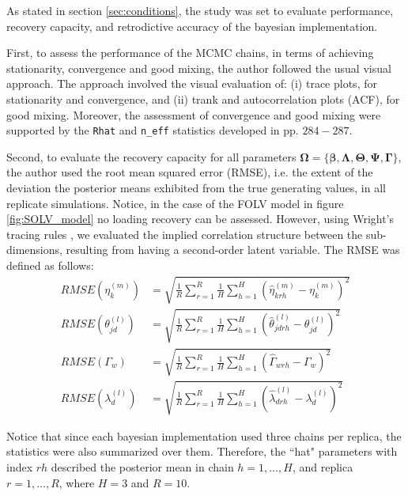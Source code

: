 As stated in section \ref{sec:conditions}, the study was set to evaluate performance, recovery capacity, and retrodictive accuracy of the bayesian implementation.

First, to assess the performance of the MCMC chains, in terms of achieving stationarity, convergence and good mixing, the author followed the usual visual approach. The approach involved the visual evaluation of: (i) trace plots, for stationarity and convergence, and (ii) trank and autocorrelation plots (ACF), for good mixing. Moreover, the assessment of convergence and good mixing were supported by the \texttt{Rhat} and \texttt{n\_eff} statistics developed in \citet{Gelman_et_al_2014} pp. $284-287$.

Second, to evaluate the recovery capacity for all parameters $\pmb{\Omega} = \{ \pmb{\beta}, \pmb{\Lambda}, \pmb{\Theta}, \pmb{\Psi}, \pmb{\Gamma} \}$, the author used the root mean squared error (RMSE), i.e. the extent of the deviation the posterior means exhibited from the true generating values, in all replicate simulations. Notice, in the case of the FOLV model in figure \ref{fig:SOLV_model} no loading recovery can be assessed. However, using Wright's tracing rules \cite{Beaujean_2014}, we evaluated the implied correlation structure between the sub-dimensions, resulting from having a second-order latent variable. The RMSE was defined as follows:
%
\begin{align}
	RMSE \left( \eta^{(m)}_{k} \right) &=\sqrt{\frac{1}{R} \sum_{r=1}^{R} \frac{1}{H} \sum_{h=1}^{H} \left( \hat{\eta}^{(m)}_{krh} - \eta^{(m)}_{k} \right)^2} \\
	RMSE \left( \theta^{(l)}_{jd} \right) &=\sqrt{\frac{1}{R} \sum_{r=1}^{R} \frac{1}{H} \sum_{h=1}^{H} \left( \hat{\theta}^{(l)}_{jdrh} - \theta^{(l)}_{jd} \right)^2} \\
	RMSE \left( \Gamma_{w} \right) &=\sqrt{\frac{1}{R} \sum_{r=1}^{R} \frac{1}{H} \sum_{h=1}^{H} \left( \hat{\Gamma}_{wrh} - \Gamma_{w} \right)^2} \\
	RMSE \left( \lambda^{(l)}_{d} \right) &=\sqrt{\frac{1}{R} \sum_{r=1}^{R} \frac{1}{H} \sum_{h=1}^{H} \left( \hat{\lambda}^{(l)}_{drh} - \lambda^{(l)}_{d} \right)^2}
\end{align}

Notice that since each bayesian implementation used three chains per replica, the statistics were also summarized over them. Therefore, the ``hat" parameters with index $rh$ described the posterior mean in chain $h=1, \dots, H$, and replica $r=1, \dots, R$, where $H=3$ and $R=10$.

